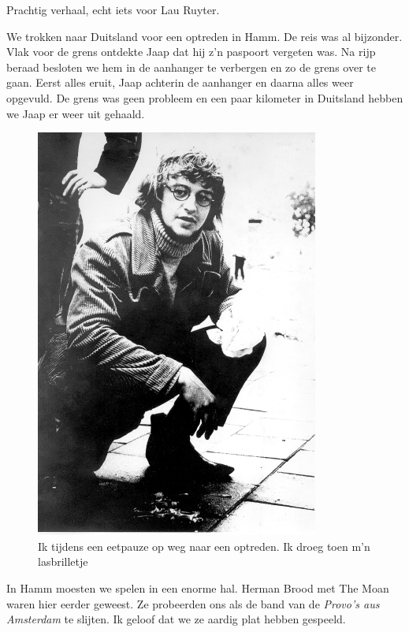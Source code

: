 \documentclass[10pt,twoside, openright]{memoir}
\begin{document}
Prachtig verhaal, echt iets voor Lau Ruyter.

We trokken naar Duitsland voor een optreden in Hamm. De reis was al bijzonder. Vlak voor de grens ontdekte Jaap dat hij z’n paspoort vergeten was. Na rijp beraad besloten we hem in de aanhanger te verbergen en zo de grens over te gaan. Eerst alles eruit, Jaap achterin de aanhanger en daarna alles weer opgevuld. De grens was geen probleem en een paar kilometer in Duitsland hebben we Jaap er weer uit gehaald. 

\begin{figure}
\includegraphics[width=\textwidth]{img/ch30/optourneeAs}
\caption*{\footnotesize Ik tijdens een eetpauze op weg naar een optreden. Ik droeg toen m'n lasbrilletje}
\end{figure}


In Hamm moesten we spelen in een enorme hal. Herman Brood met The Moan waren hier eerder geweest. Ze probeerden ons als de band van de \emph{Provo’s aus Amsterdam} te slijten. Ik geloof dat we ze aardig plat hebben gespeeld.
\end{document}
